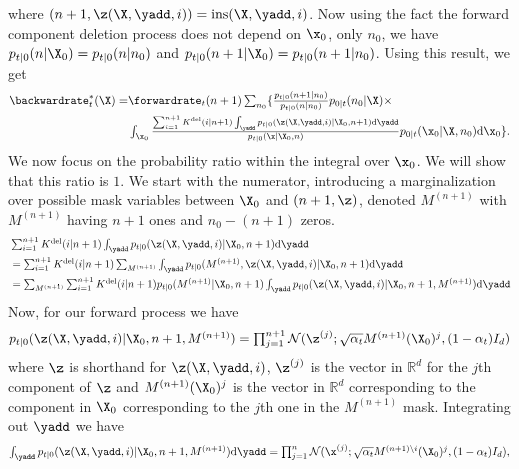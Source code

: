 where $(n+1, \z(\X, \yadd, i)) = \text{ins}(\X, \yadd, i)$. Now using the fact
the forward component deletion process does not depend on $\x_0$, only $n_0$, we
have $p_{t|0}(n | \X_0) = p_{t|0}(n | n_0)$ and
$p_{t|0}(n+1 | \X_0) = p_{t|0}(n+1 | n_0)$. Using this result, we get 
\begin{align}
   \backwardrate_t^*(\X) = &\textstyle \forwardrate_t(n+1) \sum_{n_0} \{ \frac{p_{t|0}(n+1 | n_0)}{p_{t|0}(n | n_0)} p_{0|t}(n_0 | \X) \times \\
\label{eq:backwardrateparamProofLine1}
   &\textstyle   \int_{\x_0}  \frac{\sum_{i=1}^{n+1} K^{\text{del}}(i | n+1) \int_{\yadd} p_{t|0}(\z(\X, \yadd, i) | \X_0, n+1) \rmd \yadd}{p_{t|0}(\x | \X_0, n)} p_{0|t}(\x_0 | \X, n_0)\rmd \x_0 \} . 
\end{align}
We now focus on the probability ratio within the integral over $\x_0$. We will show that this ratio is $1$. We start with the numerator, introducing a marginalization over possible mask variables between $\X_0$ and $(n+1, \z)$, denoted $M^{(n+1)}$ with $M^{(n+1)}$ having $n+1$ ones and $n_0 - (n+1)$ zeros.
\begin{align}
    &\textstyle \sum_{i=1}^{n+1} K^{\text{del}}(i | n+1) \int_{\yadd} p_{t|0}(\z(\X, \yadd, i) | \X_0, n+1) \rmd \yadd \\
    &\textstyle  = \sum_{i=1}^{n+1} K^{\text{del}}(i | n+1) \sum_{M^{(n+1)}} \int_{\yadd} p_{t|0}(M^{(n+1)}, \z(\X, \yadd, i) | \X_0, n+1) \rmd \yadd \\
    &\textstyle  = \sum_{M^{(n+1)}} \sum_{i=1}^{n+1} K^{\text{del}}(i | n+1)  p_{t|0}(M^{(n+1)} | \X_0, n+1)  \int_{\yadd} p_{t|0}(\z(\X, \yadd, i) | \X_0, n+1, M^{(n+1)}) \rmd \yadd 
\end{align}
Now, for our forward process we have
\begin{equation}
\textstyle    p_{t|0}(\z (\X, \yadd, i) | \X_0, n+1, M^{(n+1)}) = \prod_{j=1}^{n+1} \mathcal{N}( \z^{(j)} ; \sqrt{\alpha_t} M^{(n+1)}(\X_0)^j, (1-\alpha_t) I_d)
\end{equation}
where $\z$ is shorthand for $\z(\X, \yadd, i)$, $\z^{(j)}$ is the vector in $\mathbb{R}^d$ for the $j$th component of $\z$ and $M^{(n+1)}(\X_0)^j$ is the vector in $\mathbb{R}^d$ corresponding to the component in $\X_0$ corresponding to the $j$th one in the $M^{(n+1)}$ mask. Integrating out $\yadd$ we have
\begin{equation}
\textstyle    \int_{\yadd} p_{t|0}(\z(\X, \yadd, i) | \X_0, n+1, M^{(n+1)}) \rmd \yadd  = \prod_{j=1}^{n}\mathcal{N}( \x^{(j)} ; \sqrt{\alpha_t} M^{(n+1) \backslash i}(\X_0)^j, (1-\alpha_t) I_d) ,
\end{equation}
